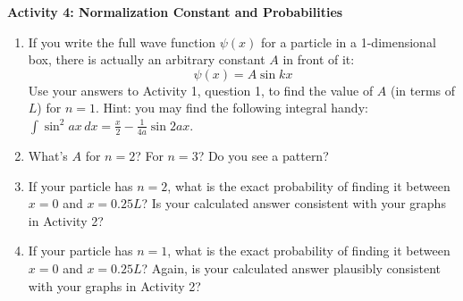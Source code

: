 \textbf{Activity 4: Normalization Constant and Probabilities}
\begin{enumerate}[wide]

\item If you write the full wave function $\psi(x)$ for a particle in a 1-dimensional box, there is actually an arbitrary constant $A$ in front of it:
$$\psi(x)=A\sin kx$$
Use your answers to Activity 1, question 1, to find the value of $A$ (in terms of $L$) for $n=1$.  
Hint: you may find the following integral handy: $\int \sin^2ax \, dx = \frac{x}{2} -\frac{1}{4a}\sin 2ax $.

\vfill

\item What's $A$ for $n=2$?  For $n=3$?  Do you see a pattern?

\vfill

\pagebreak
\item If your particle has $n=2$, what is the exact probability of finding it between $x=0$ and $x=0.25L$?  Is your calculated answer consistent with your graphs in Activity 2?
\answerspace{2in}

\item If your particle has $n=1$, what is the exact probability of finding it between $x=0$ and $x=0.25L$?  Again, is your calculated answer plausibly consistent with your graphs in Activity 2?
\answerspace{2in}

\end{enumerate}



